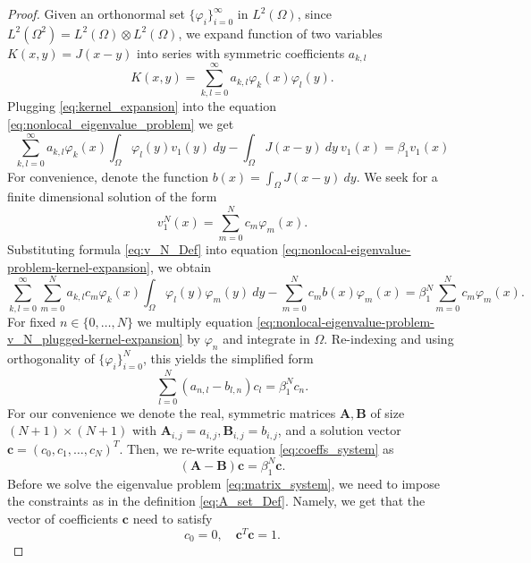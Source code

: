 \documentclass[12pt, a4paper]{article}
\theoremstyle{break}
\theoremstyle{break}
\theoremstyle{break}
\theoremstyle{break}
\theoremstyle{break}
\theoremstyle{break}
\theoremstyle{break}
\theoremstyle{break}
\theoremstyle{break}
\begin{document}
\begin{proof}

    Given an orthonormal set $\{\varphi_i\}_{i=0}^\infty$ in $L^2(\Omega)$, since $L^2(\Omega^2) = L^2(\Omega) \otimes L^2(\Omega)$, we expand function of two variables $K(x,y) = J(x-y)$ into series with symmetric coefficients $a_{k,l}$
    \begin{equation}
        \label{eq:kernel_expansion}
        K(x,y) = \sum_{k,l = 0}^\infty a_{k, l} \varphi_k(x) \varphi_l(y).
    \end{equation}
    Plugging \eqref{eq:kernel_expansion} into the equation \eqref{eq:nonlocal_eigenvalue_problem} we get
    \begin{equation}
        \label{eq:nonlocal-eigenvalue-problem-kernel-expansion}
        \sum_{k, l = 0}^\infty a_{k, l} \varphi_k(x)\int_\Omega \varphi_l(y) v_1(y)\:dy - \int_\Omega J(x-y)\:dy\: v_1(x) = \beta_1 v_1(x)
    \end{equation}
    For convenience, denote the function $b(x) = \int_\Omega J(x-y)\:dy$. We seek for a finite dimensional solution of the form
    \begin{equation}
        \label{eq:v_N_Def}
        v_1^N(x) = \sum_{m=0}^N c_m \varphi_m(x).
    \end{equation}
    Substituting formula \eqref{eq:v_N_Def} into equation \eqref{eq:nonlocal-eigenvalue-problem-kernel-expansion}, we obtain
    \begin{equation}
        \label{eq:nonlocal-eigenvalue-problem-v_N_plugged-kernel-expansion}
        \sum_{k, l = 0}^\infty \sum_{m=0}^N a_{k, l} c_m \varphi_k(x)\int_\Omega \varphi_l(y) \varphi_m(y)\:dy - \sum_{m=0}^N c_m b(x) \varphi_m(x) = \beta_1^N \sum_{m=0}^N c_m \varphi_m(x).
    \end{equation}
    For fixed $n \in \{0, \ldots, N\}$ we multiply equation \eqref{eq:nonlocal-eigenvalue-problem-v_N_plugged-kernel-expansion} by $\varphi_n$ and integrate in $\Omega$. Re-indexing and using orthogonality of $\{\varphi_i\}_{i=0}^N$, this yields the simplified form
    \begin{equation}
        \label{eq:coeffs_system}
        \sum_{l=0}^N(a_{n, l} - b_{l,n}) c_l = \beta_1^N c_n.
    \end{equation}
    For our convenience we denote the real, symmetric matrices $\mathbf{A}, \mathbf{B}$ of size $(N+1) \times (N+1)$ with $\mathbf{A}_{i,j} = a_{i,j}, \mathbf{B}_{i, j} = b_{i,j}$, and a solution vector $\mathbf{c} = (c_0, c_1, \ldots, c_N)^T$. Then, we re-write equation \eqref{eq:coeffs_system} as
    \begin{equation}
        \label{eq:matrix_system}
        (\mathbf{A} - \mathbf{B}) \mathbf{c} = \beta_1^N \mathbf{c}.
    \end{equation}
    Before we solve the eigenvalue problem \eqref{eq:matrix_system}, we need to impose the constraints as in the definition \eqref{eq:A_set_Def}. Namely, we get that the vector of coefficients $\mathbf{c}$ need to satisfy
    \begin{equation}
        \label{eq:matrix_system_constraint}
        c_0 = 0, \quad \mathbf{c}^T \mathbf{c} = 1.
    \end{equation}
    

\end{proof}
\end{document}
